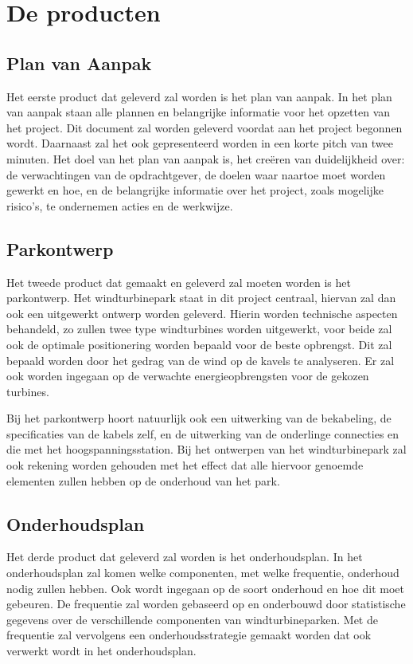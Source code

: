 \section{De producten}
\subsection{Plan van Aanpak}
Het eerste product dat geleverd zal worden is het plan van aanpak. In het plan van aanpak staan alle plannen en belangrijke informatie voor het opzetten van het project. Dit document zal worden geleverd voordat aan het project begonnen wordt. Daarnaast zal het ook gepresenteerd worden in een korte pitch van twee minuten. Het doel van het plan van aanpak is, het creëren van duidelijkheid over: de verwachtingen van de opdrachtgever, de doelen waar naartoe moet worden gewerkt en hoe, en de belangrijke informatie over het project, zoals mogelijke risico's, te ondernemen acties en de werkwijze. 

\subsection{Parkontwerp}
Het tweede product dat gemaakt en geleverd zal moeten worden is het parkontwerp. Het windturbinepark staat in dit project centraal, hiervan zal dan ook een uitgewerkt ontwerp worden geleverd. Hierin worden technische aspecten behandeld, zo zullen twee type windturbines worden uitgewerkt, voor beide zal ook de optimale positionering worden bepaald voor de beste opbrengst. Dit zal bepaald worden door het gedrag van de wind op de kavels te analyseren. Er zal ook worden ingegaan op de verwachte energieopbrengsten voor de gekozen turbines. 

Bij het parkontwerp hoort natuurlijk ook een uitwerking van de bekabeling, de specificaties van de kabels zelf, en de uitwerking van de onderlinge connecties en die met het hoogspanningsstation. Bij het ontwerpen van het windturbinepark zal ook rekening worden gehouden met het effect dat alle hiervoor genoemde elementen zullen hebben op de onderhoud van het park. 

\subsection{Onderhoudsplan}
Het derde product dat geleverd zal worden is het onderhoudsplan. In het onderhoudsplan zal komen welke componenten, met welke frequentie, onderhoud nodig zullen hebben. Ook wordt ingegaan op de soort onderhoud en hoe dit moet gebeuren. De frequentie zal worden gebaseerd op en onderbouwd door statistische gegevens over de verschillende componenten van windturbineparken. Met de frequentie zal vervolgens een onderhoudsstrategie gemaakt worden dat ook verwerkt wordt in het onderhoudsplan. 

